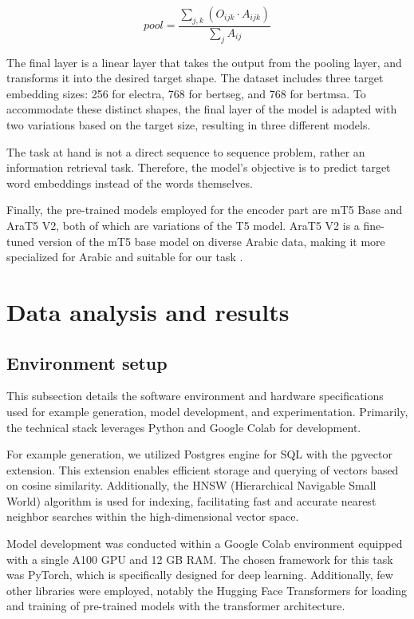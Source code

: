 \documentclass[15pt]{article}
\begin{document}
\begin{equation}
    pool = \frac{\sum_{j,k} (O_{ijk} \cdot A_{ijk})}{\sum_j A_{ij}}
\end{equation}

The final layer is a linear layer that takes the output from the pooling layer, and transforms it into the desired target shape. The dataset includes three target embedding sizes: 256 for electra, 768 for bertseg, and 768 for bertmsa. To accommodate these distinct shapes, the final layer of the model is adapted with two variations based on the target size, resulting in three different models.

The task at hand is not a direct sequence to sequence problem, rather an information retrieval task. Therefore, the model's objective is to predict target word embeddings instead of the words themselves.

Finally, the pre-trained models employed for the encoder part are mT5 Base and AraT5 V2, both of which are variations of the T5 model. AraT5 V2 is a fine-tuned version of the mT5 base model on diverse Arabic data, making it more specialized for Arabic and suitable for our task \cite{Nagoudi2021}.

\section{Data analysis and results}

\subsection{Environment setup}

This subsection details the software environment and hardware specifications used for example generation, model development, and experimentation. Primarily, the technical stack leverages Python and Google Colab for development.

For example generation, we utilized Postgres engine for SQL with the pgvector extension. This extension enables efficient storage and querying of vectors based on cosine similarity. Additionally, the HNSW (Hierarchical Navigable Small World) algorithm is used for indexing, facilitating fast and accurate nearest neighbor searches within the high-dimensional vector space.

Model development was conducted within a Google Colab environment equipped with a single A100 GPU and 12 GB RAM. The chosen framework for this task was PyTorch, which is specifically designed for deep learning. Additionally, few other libraries were employed, notably the Hugging Face Transformers for loading and training of pre-trained models with the transformer architecture.
\end{document}
